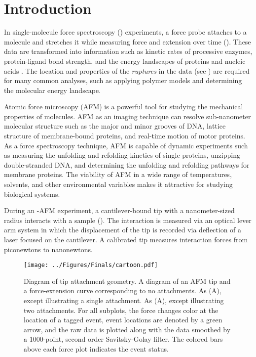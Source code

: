 \chapter{Introduction}
In single-molecule force spectroscopy (\singlemol{}) experiments, a force probe attaches to a molecule and stretches it while measuring force and extension over time (). These data are transformed into information such as kinetic rates of processive enzymes, protein-ligand bond strength,  and the energy landscapes of proteins and nucleic acids . The location and properties of the \textit{ruptures} in the data (see ) are required for many common \singlemol{} analyses, such as applying polymer models and determining the molecular energy landscape.

Atomic force microscopy (AFM) is a powerful tool for studying the mechanical properties of molecules.  AFM as an imaging technique can resolve sub-nanometer molecular structure such as the major and minor grooves of DNA, lattice structure of membrane-bound proteins, and real-time motion of motor proteins. As a force spectroscopy technique, AFM is capable of dynamic experiments such as measuring the unfolding and refolding kinetics of single proteins, unzipping double-stranded DNA, and determining the unfolding and refolding pathways for membrane proteins. The viability of AFM in a wide range of temperatures, solvents, and other environmental variables makes it attractive for studying biological systems. 

During an \singlemol{}-AFM experiment, a cantilever-bound tip with a nanometer-sized radius interacts with a sample (). The interaction is measured via an optical lever arm system\cite{meyer_novel_1998} in which the displacement of the tip is recorded via deflection of a laser focused on the cantilever. A calibrated tip measures interaction forces from piconewtons to nanonewtons. 

\begin{figure}[htpb]
\caption[Diagram of AFM attachment geometry]{Diagram of tip attachment geometry.  A diagram of an AFM tip and a force-extension curve corresponding to no attachments.  As (A), except illustrating a single attachment.  As (A), except illustrating two attachments. For all subplots, the force changes color at the location of a tagged event, event locations are denoted by a green arrow, and the raw data is plotted along with the data smoothed by a 1000-point, second order Savitsky-Golay filter. The colored bars above each force plot indicates the event status.}
\centering
\texttt{[image: ../Figures/Finals/cartoon.pdf]}%
\end{figure}

